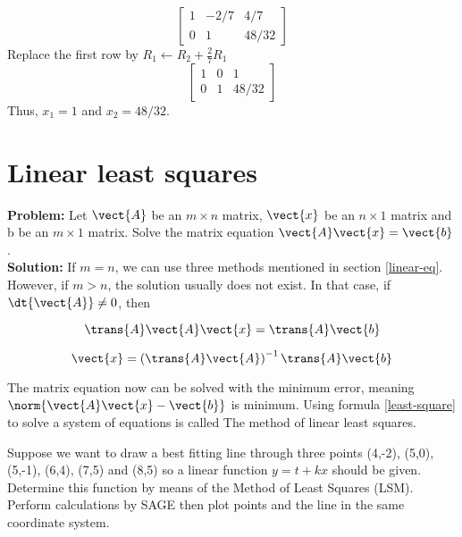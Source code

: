 \begin{example}
\begin{equation*}
    \left[{\begin{array}{cc|c}
        1&-2/7&4/7 \\ 0&1&48/32
    \end{array}}\right]
\end{equation*}
Replace the first row by $R_1 \leftarrow R_2+ \frac{2}{7} R_1$
\begin{equation*}
    \left[{\begin{array}{cc|c}
        1&0&1 \\ 0&1&48/32
    \end{array}}\right]
\end{equation*}
Thus, $x_1=1$ and $x_2=48/32$.
\end{example}
\section{Linear least squares}
\textbf{Problem:} Let $\vect{A}$ be an $m\times n$ matrix, $\vect{x}$ be an $n\times 1$ matrix and b be an $m\times 1$ matrix. Solve the matrix equation $\vect{A}\vect{x}=\vect{b}$.\\
 
\textbf{Solution:} If $m=n$, we can use three methods mentioned in section \ref{linear-eq}. However, if $m>n$, the solution usually does not exist. In that case, if $\dt{\vect{A}} \neq 0$, then 

\begin{equation*}
\trans{A}\vect{A}\vect{x}=\trans{A}\vect{b}
\end{equation*}

\begin{equation}\label{least-square}
\vect{x}=\left( \trans{A}\vect{A} \right)^{-1} \trans{A}\vect{b}
\end{equation}

The matrix equation now can be solved with the minimum error, meaning $\norm{\vect{A}\vect{x}-\vect{b}}$ is minimum. Using formula \eqref{least-square} to solve a system of equations is called The method of linear least squares.

\begin{exercise}
Suppose we want to draw a best fitting line through three points (4,-2), (5,0), (5,-1), (6,4), (7,5) and (8,5) so a linear function $y=t+kx$ should be given. Determine this function by means of the Method of Least Squares (LSM). Perform calculations by SAGE then plot points and the line in the same coordinate system.
\end{exercise}


